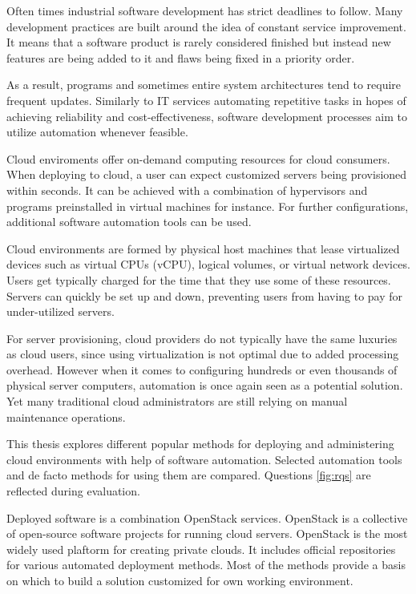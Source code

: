 \documentclass[officiallayout]{tktla}
\begin{document}
Often times industrial software development has strict deadlines to follow.
Many development practices are built around the idea of constant service
improvement. It means that a software product is rarely considered finished but
instead new features are being added to it and flaws being fixed in a priority
order.

As a result, programs and sometimes entire system architectures tend to require
frequent updates. Similarly to IT services automating repetitive tasks in hopes
of achieving reliability and cost-effectiveness, software development processes
aim to utilize automation whenever feasible.

Cloud enviroments offer on-demand computing resources for cloud consumers. When
deploying to cloud, a user can expect customized servers being provisioned
within seconds. It can be achieved with a combination of hypervisors and
programs preinstalled in virtual machines for instance. For further
configurations, additional software automation tools can be used.

Cloud environments are formed by physical host machines that lease virtualized
devices such as virtual CPUs (vCPU), logical volumes, or virtual network
devices. Users get typically charged for the time that they use some of these
resources. Servers can quickly be set up and down, preventing users from
having to pay for under-utilized servers.

For server provisioning, cloud providers do not typically have the same
luxuries as cloud users, since using virtualization is not optimal due to added
processing overhead. However when it comes to configuring hundreds or even
thousands of physical server computers, automation is once again seen as a
potential solution. Yet many traditional cloud administrators are still relying
on manual maintenance operations.

This thesis explores different popular methods for deploying and administering
cloud environments with help of software automation. Selected automation tools
and de facto methods for using them are compared. Questions \ref{fig:rqs} are
reflected during evaluation.

Deployed software is a combination OpenStack services. OpenStack is a
collective of open-source software projects for running cloud servers.
OpenStack is the most widely used plaftorm for creating private clouds. It
includes official repositories for various automated deployment methods. Most
of the methods provide a basis on which to build a solution customized for own
working environment.
\end{document}

